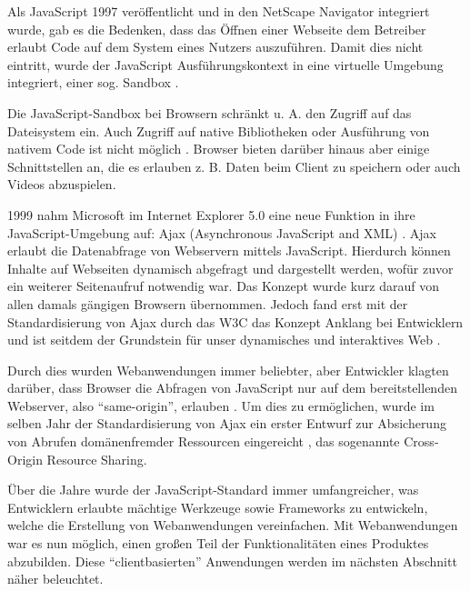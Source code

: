 
Als JavaScript 1997 veröffentlicht und in den NetScape Navigator integriert wurde, gab es die Bedenken, dass das Öffnen einer Webseite dem Betreiber erlaubt Code auf dem System eines Nutzers auszuführen. Damit dies nicht eintritt, wurde der JavaScript Ausführungskontext in eine virtuelle Umgebung integriert, einer sog. Sandbox \cite{LearningJavaScript}.

Die JavaScript-Sandbox bei Browsern schränkt u. A. den Zugriff auf das Dateisystem ein. Auch Zugriff auf native Bibliotheken oder Ausführung von nativem Code ist nicht möglich \cite{TheSpyInTheSandbox}. Browser bieten darüber hinaus aber einige Schnittstellen an, die es erlauben z. B. Daten beim Client zu speichern oder auch Videos abzuspielen.


1999 nahm Microsoft im Internet Explorer 5.0 eine neue Funktion in ihre JavaScript-Umgebung auf: Ajax (Asynchronous JavaScript and XML) \cite{MDNAjax}. Ajax erlaubt die Datenabfrage von Webservern mittels JavaScript. Hierdurch können Inhalte auf Webseiten dynamisch abgefragt und dargestellt werden, wofür zuvor ein weiterer Seitenaufruf notwendig war. Das Konzept wurde kurz darauf von allen damals gängigen Browsern übernommen. Jedoch fand erst mit der Standardisierung von Ajax durch das W3C \cite{TheXMLHttpRequestObject} das Konzept Anklang bei Entwicklern \cite{AngularForEnterpriseReadyWebApplications} \cite{FinkIntroducingSPAs} und ist seitdem der Grundstein für unser dynamisches und interaktives Web \cite{ResearchOnAJAXTechnology}.

Durch dies wurden Webanwendungen immer beliebter, aber Entwickler klagten darüber, dass Browser die Abfragen von JavaScript nur auf dem bereitstellenden Webserver, also \enquote{same-origin}, erlauben \cite{CrossSiteXHRWithCORS}. Um dies zu ermöglichen, wurde im selben Jahr der Standardisierung von Ajax ein erster Entwurf zur Absicherung von Abrufen domänenfremder Ressourcen eingereicht \cite{AuthorizingCORS}, das sogenannte Cross-Origin Resource Sharing.

Über die Jahre wurde der JavaScript-Standard immer umfangreicher, was Entwicklern erlaubte mächtige Werkzeuge sowie Frameworks zu entwickeln, welche die Erstellung von Webanwendungen vereinfachen. Mit Webanwendungen war es nun möglich, einen großen Teil der Funktionalitäten eines Produktes abzubilden. Diese \enquote{clientbasierten} Anwendungen werden im nächsten Abschnitt näher beleuchtet.

